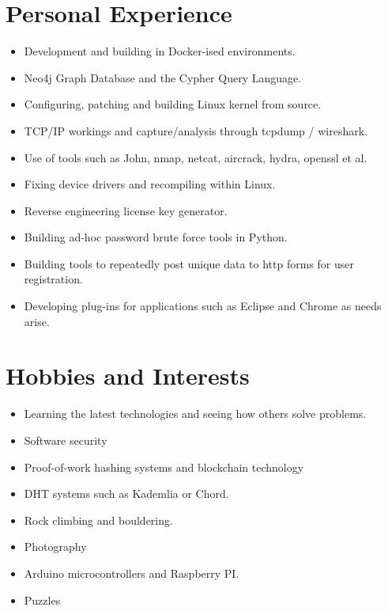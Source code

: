 \documentclass[a4paper,10pt]{moderncv}
\begin{document}
\section{Personal Experience}
\begin{itemize}
\item Development and building in Docker-ised environments.
\item Neo4j Graph Database and the Cypher Query Language.
\item Configuring, patching and building Linux kernel from source.
\item TCP/IP workings and capture/analysis through tcpdump / wireshark.
\item Use of tools such as John, nmap, netcat, aircrack, hydra, openssl et al.
\item Fixing device drivers and recompiling within Linux.
\item Reverse engineering license key generator.
\item Building ad-hoc password brute force tools in Python.
\item Building tools to repeatedly post unique data to http forms for user registration.
\item Developing plug-ins for applications such as Eclipse and Chrome as needs arise.
\end{itemize}

\section{Hobbies and Interests}
\begin{itemize}
\item Learning the latest technologies and seeing how others solve problems.
\item Software security
\item Proof-of-work hashing systems and blockchain technology
\item DHT systems such as Kademlia or Chord.
\item Rock climbing and bouldering.
\item Photography
\item Arduino microcontrollers and Raspberry PI.
\item Puzzles
\end{itemize}
\end{document}
